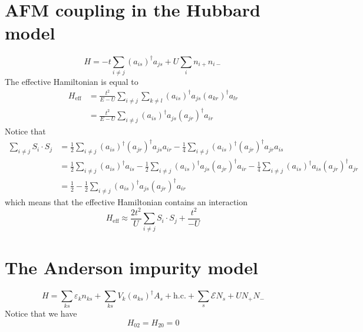 \documentclass[12pt, oneside]{book}
\begin{document}
\section*{AFM coupling in the Hubbard model}
\[
H=-t\sum_{i\ne j}(a_{is})^{\dagger}a_{js}+U\sum_in_{i+}n_{i-}
\]
The effective Hamiltonian is equal to
\begin{align*}
H_{\text{eff}}
&=\frac{t^2}{E-U}\sum_{i\ne j}\sum_{k\ne l}(a_{is})^{\dagger}a_{js}(a_{kr})^{\dagger}a_{lr}\\
&=\frac{t^2}{E-U}\sum_{i\ne j}(a_{is})^{\dagger}a_{js}(a_{jr})^{\dagger}a_{ir}
\end{align*}
Notice that
\begin{align*}
\sum_{i\ne j}S_i\cdot S_j
&=\frac12\sum_{i\ne j}(a_{is})^{\dagger}(a_{jr})^{\dagger}a_{js}a_{ir}-\frac14\sum_{i\ne j}(a_{is})^{\dagger}(a_{jr})^{\dagger}a_{jr}a_{is}\\
&=\frac12\sum_{i\ne j}(a_{is})^{\dagger}a_{is}-\frac12\sum_{i\ne j}(a_{is})^{\dagger}a_{js}(a_{jr})^{\dagger}a_{ir}-\frac14\sum_{i\ne j}(a_{is})^{\dagger}a_{is}(a_{jr})^{\dagger}a_{jr}\\
&=\frac12-\frac12\sum_{i\ne j}(a_{is})^{\dagger}a_{js}(a_{jr})^{\dagger}a_{ir}
\end{align*}
which means that the effective Hamiltonian contains an interaction
\[
H_{\text{eff}}\approx\frac{2t^2}{U}\sum_{i\ne j}S_i\cdot S_j+\frac{t^2}{-U}
\]

\section*{The Anderson impurity model}
\[
H=\sum_{ks}\varepsilon_kn_{ks}+\sum_{ks}V_k(a_{ks})^{\dagger}A_s+\text{h.c.}+\sum_s\mathcal{E}N_s+UN_+N_-
\]
Notice that we have
\[
H_{02}=H_{20}=0
\]
\end{document}
